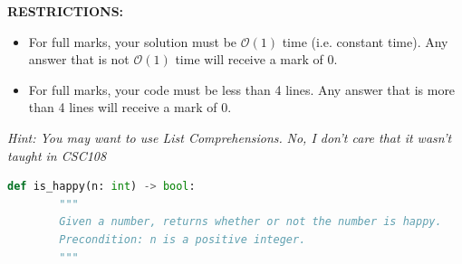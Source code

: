 \documentclass[letterpaper,12pt,addpoints]{exam}
\begin{document}
\begin{questions}
    \begin{center}
        \textbf{RESTRICTIONS:}
        \begin{itemize}
            \item For full marks, your solution must be $\mathcal{O}(1)$ time (i.e. constant
                  time). Any answer that is not $\mathcal{O}(1)$ time will receive a mark of 0.
            \item For full marks, your code must be less than 4 lines. Any answer that is more
                  than 4 lines will receive a mark of 0.
        \end{itemize}
        \textit{Hint: You may want to use List Comprehensions.}
        \textit{No, I don't care that it wasn't taught in CSC108}
    \end{center}
    \begin{lstlisting}[language=Python, style=mystyle]
    def is_happy(n: int) -> bool:
        """
        Given a number, returns whether or not the number is happy.
        Precondition: n is a positive integer.
        """
    \end{lstlisting}


\end{questions}
\end{document}
